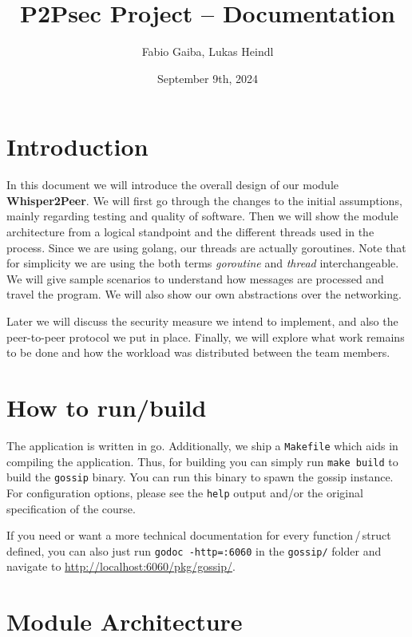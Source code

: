 \documentclass[a4paper,english,10pt,NET]{tumarticle}
\title{P2Psec Project -- Documentation}
\author{Fabio Gaiba, Lukas Heindl}
\date{September 9th, 2024}
\begin{document}
\maketitle
\thispagestyle{tumarticle}

\section{Introduction}
In this document we will introduce the overall design of our module \textbf{Whisper2Peer}.
We will first go through the changes to the initial assumptions, mainly regarding testing and quality of software.
Then we will show the module architecture from a logical standpoint and the different threads used in the process.
Since we are using golang, our threads are actually goroutines.
Note that for simplicity we are using the both terms \emph{goroutine} and \emph{thread} interchangeable.
We will give sample scenarios to understand how messages are processed and travel the program.
We will also show our own abstractions over the networking.

Later we will discuss the security measure we intend to implement, and also the peer-to-peer protocol we put in place. Finally, we will explore what work remains to be done and how the workload was distributed between the team members.

\section{How to run/build}
The application is written in go.
Additionally, we ship a \texttt{Makefile} which aids in compiling the application.
Thus, for building you can simply run \texttt{make build} to build the \texttt{gossip} binary.
You can run this binary to spawn the gossip instance.
For configuration options, please see the \texttt{\-\-help} output and/or the original specification of the course.


If you need or want a more technical documentation for every function\,/\,struct defined, you can also just run \texttt{godoc -http=:6060} in the \texttt{gossip/} folder and navigate to \url{http://localhost:6060/pkg/gossip/}.

\section{Module Architecture}
\end{document}
